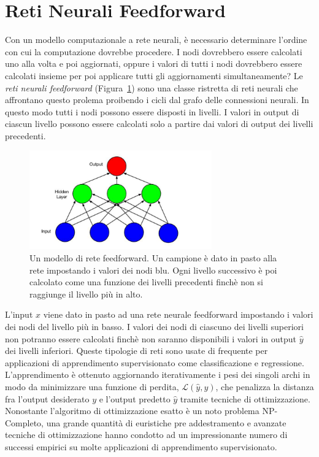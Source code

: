 \section{Reti Neurali Feedforward}
Con un modello computazionale a rete neurali, \`e necessario determinare l'ordine con cui la computazione dovrebbe procedere.
I nodi dovrebbero essere calcolati uno alla volta e poi aggiornati, oppure i valori di tutti i nodi dovrebbero essere calcolati insieme per poi applicare tutti gli aggiornamenti simultaneamente?
Le \emph{reti neurali feedforward} (Figura~\ref{fig:feedforwardNeuralNetwork}) sono una classe ristretta di reti neurali che affrontano questo prolema proibendo i cicli dal grafo delle connessioni neurali.
In questo modo tutti i nodi possono essere disposti in livelli.
I valori in output di ciascun livello possono essere calcolati solo a partire dai valori di output dei livelli precedenti.
\begin{figure}[tp]
  \centering
  \begin{center}
    \includegraphics[width=0.7\textwidth]{./images/feedForwardNeuralNetwork.png}
  \end{center}
  \caption{Un modello di rete feedforward.
  Un campione \`e dato in pasto alla rete impostando i valori dei nodi blu.
  Ogni livello successivo \`e poi calcolato come una funzione dei livelli precedenti finch\`e non si raggiunge il livello pi\`u in alto.}
  \label{fig:feedforwardNeuralNetwork}
\end{figure}

L'input $x$ viene dato in pasto ad una rete neurale feedforward impostando i valori dei nodi del livello pi\`u in basso.
I valori dei nodi di ciascuno dei livelli superiori non potranno essere calcolati finch\`e non saranno disponibili i valori in output $\hat{y}$ dei livelli inferiori.
Queste tipologie di reti sono usate di frequente per applicazioni di apprendimento supervisionato come classificazione e regressione.
L'apprendimento \`e ottenuto aggiornando iterativamente i pesi dei singoli archi in modo da minimizzare una funzione di perdita, $\mathcal{L}(\hat{y},y)$, che penalizza la distanza fra l'output desiderato $y$ e l'output predetto $\hat{y}$ tramite tecniche di ottimizzazione.
Nonostante l'algoritmo di ottimizzazione esatto \`e un noto problema NP-Completo, una grande quantit\`a di euristiche pre addestramento e avanzate tecniche di ottimizzazione hanno condotto ad un impressionante numero di successi empirici su molte applicazioni di apprendimento supervisionato.

